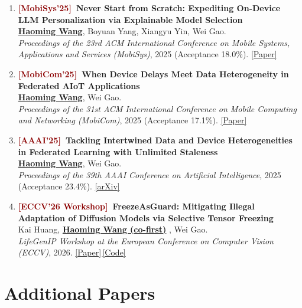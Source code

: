 \documentclass[11pt, letterpaper]{article}
\newenvironment{publist}{
  \begin{enumerate}[leftmargin=1.7em, itemsep=4pt, parsep=0pt, topsep=2pt,
                    label=\arabic*., ref=\arabic*, series=pubs]
}{\end{enumerate}}
\newcommand{\me}{\underline{\textbf{Haoming Wang}}}
\newcommand{\meco}{\underline{\textbf{Haoming Wang (co-first)}} }
\begin{document}
\begin{publist}
\item\label{pub:xpert} \textbf{\textcolor{darkred}{[MobiSys'25]}\ Never Start from Scratch: Expediting On-Device LLM Personalization via Explainable Model Selection}\\
\me, Boyuan Yang, Xiangyu Yin, Wei Gao.\\
\textit{Proceedings of the 23rd ACM International Conference on Mobile Systems, Applications and Services (MobiSys)}, 2025 (Acceptance 18.0\%). \href{https://haomingwang645.github.io/pdfs/xpert_paper.pdf}{[Paper]}

\item\label{pub:feddc} \textbf{\textcolor{darkred}{[MobiCom'25]}\ When Device Delays Meet Data Heterogeneity in Federated AIoT Applications}\\
\me, Wei Gao.\\
\textit{Proceedings of the 31st ACM International Conference on Mobile Computing and Networking (MobiCom)}, 2025 (Acceptance 17.1\%). \href{https://haomingwang645.github.io/pdfs/feddc_paper.pdf}{[Paper]}

\item\label{pub:aaai} \textbf{\textcolor{darkred}{[AAAI'25]}\ Tackling Intertwined Data and Device Heterogeneities in Federated Learning with Unlimited Staleness}\\
\me, Wei Gao.\\
\textit{Proceedings of the 39th AAAI Conference on Artificial Intelligence}, 2025 (Acceptance 23.4\%). \href{https://arxiv.org/abs/2309.13536}{[arXiv]}




\item\label{pub:freeze} \textbf{\textcolor{darkred}{[ECCV'26 Workshop]}\ FreezeAsGuard: Mitigating Illegal Adaptation of Diffusion Models via Selective Tensor Freezing}\\
Kai Huang, \meco, Wei Gao.\\
\textit{LifeGenIP Workshop at the European Conference on Computer Vision (ECCV)}, 2026. \href{https://haomingwang645.github.io/pdfs/freezeasguard_paper.pdf}{[Paper]}\,\href{https://github.com/pittisl/FreezeAsGuard}{[Code]}



\end{publist}

\section{Additional Papers}
\end{document}
